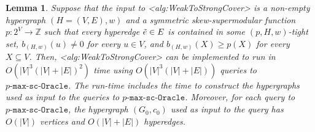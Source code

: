 \documentclass{article}
\def\Cref#1{<#1>}%
\newtheorem{lemma}{Lemma}[section]
\newcommand{\functionMaximizationOracleStrongCover}[1]{\ensuremath{{#1}\text{-}\mathtt{max}\text{-}\mathtt{sc}\text{-}\mathtt{Oracle}}\xspace}
\providecommand{\Z}{\mathbb{Z}}
\begin{document}
\begin{lemma}\label{lem:WeakToStrong:strongly-polytime:main}
Suppose that the input to \Cref{alg:WeakToStrongCover} is a non-empty hypergraph $(H = (V, E), w)$ and a symmetric skew-supermodular function $p:2^V\rightarrow \Z$ such that every hyperedge $\Tilde{e} \in E$ is contained in some $(p, H, w)$-tight set, $b_{(H,w)}(u) \not = 0$ for every $u \in V$, and $b_{(H,w)}(X) \geq p(X)$ for every $X \subseteq V$.
 Then, \Cref{alg:WeakToStrongCover}  can be implemented to run in $O(|V|^3(|V| + |E|)^2)$ time using $O(|V|^3(|V|+|E|))$ queries to \functionMaximizationOracleStrongCover{p}. The run-time includes the time to construct the hypergraphs used as input to the queries to \functionMaximizationOracleStrongCover{p}.
Moreover, for each query to \functionMaximizationOracleStrongCover{p}, the hypergraph $(G_0, c_0)$ used as input to the query has $O(|V|)$ vertices and $O(|V|+|E|)$ hyperedges.
\end{lemma}
\end{document}
